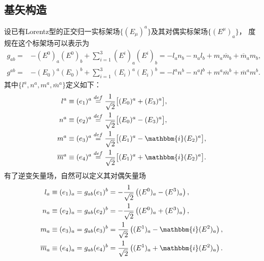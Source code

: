 \subsection{基矢构造}
设已有Lorentz型的正交归一实标架场$\{(E_\mu)^a\}$及其对偶实标架场$\{(E^\mu)_a\}$，
度规在这个标架场可以表示为
\setlength{\mathindent}{0em}
\begin{subequations}
    \begin{align}
        g_{ab} = & -(E^0)_a (E^0)_b + \sum\limits_{i=1}^3 {(E^i)_a (E^i)_b }
        = -l_a n_b - n_a l_b + m_a \overline{m}_b + \overline{m}_a {m}_b , \\
        g^{ab} = & -(E_0)^a (E_0)^b + \sum\limits_{i=1}^3 {(E_i)^a (E_i)^b }
        = -l^a n^b - n^a l^b + m^a \overline{m}^b + \overline{m}^a {m}^b .
    \end{align}
\end{subequations}\setlength{\mathindent}{2em}
其中$\{l^a, n^a, m^a, \overline{m}^a\}$定义如下\parencite[Ch. 3]{penrose-Rindler1984}：
\begin{subequations}\label{chnull:eqn_Newman-Penrose-bases}
    \begin{align}
        {l^a} & \equiv (e_1)^a \overset{def}{=} \frac{1}{\sqrt{2}}
        \bigl[ (E_0)^a + (E_3)^a \bigr] ,   \label{chnull:eqn_Newman-Penrose-base-l} \\
        {n^a} & \equiv (e_2)^a \overset{def}{=} \frac{1}{\sqrt{2}}
        \bigl[ (E_0)^a - (E_3)^a \bigr] ,  \label{chnull:eqn_Newman-Penrose-base-n}\\
        {m^a} & \equiv (e_3)^a \overset{def}{=} \frac{1}{\sqrt{2}}
        \bigl[ (E_1)^a - \mathbbm{i} (E_2)^a \bigr]  , \label{chnull:eqn_Newman-Penrose-base-m}\\
        {\overline{m}^a} & \equiv (e_4)^a \overset{def}{=} \frac{1}{\sqrt{2}}
        \bigl[ (E_1)^a + \mathbbm{i} (E_2)^a \bigr] . \label{chnull:eqn_Newman-Penrose-base-mb}
    \end{align}
\end{subequations}
有了逆变矢量场，自然可以定义其对偶矢量场
\begin{subequations}\label{chnull:eqn_Newman-Penrose-cov-bases}
    \begin{align}
        {l_a}  &\equiv (e_1)_a  = g_{ab} (e_1)^b
        =  -\frac{1}{\sqrt{2}}\left( (E^0)_a - (E^3)_a  \right) , \\
        {n_a}  &\equiv (e_2)_a  = g_{ab} (e_2)^b
        =  -\frac{1}{\sqrt{2}}\left( (E^0)_a + (E^3)_a  \right) , \\
        {m}_a  &\equiv (e_3)_a  = g_{ab} (e_3)^b
        =  \frac{1}{\sqrt{2}}\left( (E^1)_a - \mathbbm{i} (E^2)_a  \right) , \\
        \overline{m}_a  &\equiv (e_4)_a  = g_{ab} (e_4)^b
        =  \frac{1}{\sqrt{2}}\left( (E^1)_a + \mathbbm{i} (E^2)_a  \right) .
    \end{align}
\end{subequations}
